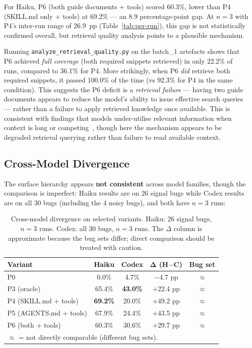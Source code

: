 \documentclass[10pt,a4paper,twocolumn]{article}
\begin{document}
For Haiku, P6 (both guide documents + tools) scored 60.3\%, lower than P4 (SKILL.md only + tools) at 69.2\% --- an 8.9 percentage-point gap.
At $n{=}3$ with P4's inter-run range of 26.9~pp (Table~\ref{tab:per-run}), this gap is not statistically confirmed overall, but retrieval quality analysis points to a plausible mechanism.

Running \texttt{analyze\_retrieval\_quality.py} on the batch\_1 artefacts shows that P6 achieved \emph{full coverage} (both required snippets retrieved) in only 22.2\% of runs, compared to 36.1\% for P4.
More strikingly, when P6 \emph{did} retrieve both required snippets, it passed 100.0\% of the time (vs 92.3\% for P4 in the same condition).
This suggests the P6 deficit is a \emph{retrieval failure} --- having two guide documents appears to reduce the model's ability to issue effective search queries --- rather than a failure to apply retrieved knowledge once available.
This is consistent with findings that models under-utilise relevant information when context is long or competing~\citep{liu2023lostmiddle}, though here the mechanism appears to be degraded retrieval querying rather than failure to read available context.

\subsection{Cross-Model Divergence}
\label{sec:cross-model}

The surface hierarchy appears \textbf{not consistent} across model families, though the comparison is imperfect: Haiku results are on 26 signal bugs while Codex results are on all 30 bugs (including the 4 noisy bugs), and both have $n{=}3$ runs:

\begin{table}[t]
\centering
\caption{Cross-model divergence on selected variants. Haiku: 26 signal bugs, $n{=}3$ runs. Codex: all 30 bugs, $n{=}3$ runs. The $\Delta$ column is approximate because the bug sets differ; direct comparison should be treated with caution.}
\label{tab:cross-model}
\begin{tabular}{@{}lcccc@{}}
\toprule
\textbf{Variant} & \textbf{Haiku} & \textbf{Codex} & $\boldsymbol{\Delta}$ \textbf{(H$-$C)} & \textbf{Bug set} \\
\midrule
P0                         & 0.0\%             & 4.7\%             & $-$4.7 pp  & $\approx$ \\
P3 (oracle)                & 65.4\%            & \textbf{43.0\%}   & $+$22.4 pp & $\approx$ \\
P4 (SKILL.md + tools)      & \textbf{69.2\%}   & 20.0\%            & $+$49.2 pp & $\approx$ \\
P5 (AGENTS.md + tools)     & 67.9\%            & 24.4\%            & $+$43.5 pp & $\approx$ \\
P6 (both + tools)          & 60.3\%            & 30.6\%            & $+$29.7 pp & $\approx$ \\
\bottomrule
\multicolumn{5}{l}{\small $\approx$ = not directly comparable (different bug sets).} \\
\end{tabular}
\end{table}
\end{document}
